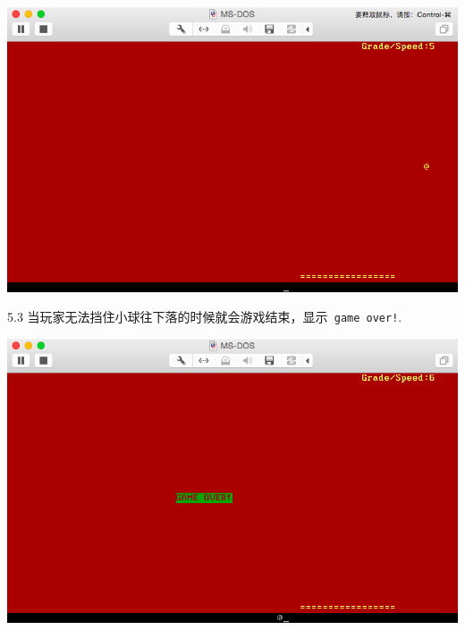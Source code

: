 \documentclass[a4paper]{article}
\begin{document}
{  \begin{center} \includegraphics[scale=0.5]{Illustrations/gaming.png} \end{center}
5.3 当玩家无法挡住小球往下落的时候就会游戏结束，显示\verb| game over!|.\\
  \begin{center} \includegraphics[scale=0.5]{Illustrations/over.png} \end{center}


}
\end{document}
